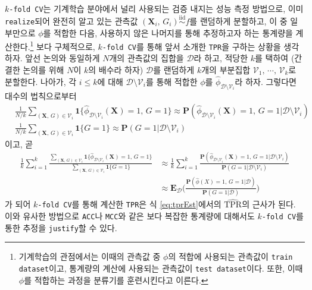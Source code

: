 \documentclass[10pt,onecolumn,twoside,a4size]{gsag3jnl}
\newcommand{\iid}{\stackrel{\mathrm{iid}}{\sim}}
\begin{document}
\texttt{$k$-fold CV}는 기계학습 분야에서 널리 사용되는 검증 내지는 성능 측정 방법으로, 이미 \texttt{realize}되어 완전히 알고 있는 관측값 $(\mathbf{X}_i,\,G_i)\iid f$를 랜덤하게 분할하고, 이 중 일부만으로 $\phi$를 적합한 다음, 사용하지 않은 나머지를 통해 추정하고자 하는 통계량을 계산한다.\footnote{기계학습의 관점에서는 이때의 관측값 중 $\phi$의 적합에 사용되는 관측값이 \texttt{train dataset}이고, 통계량의 계산에 사용되는 관측값이 \texttt{test dataset}이다. 또한, 이때 $\phi$를 적합하는 과정을 분류기를 훈련시킨다고 이른다.} 보다 구체적으로, \texttt{$k$-fold CV}를 통해 앞서 소개한 \texttt{TPR}을 구하는 상황을 생각하자. 앞선 논의와 동일하게 $N$개의 관측값의 집합을 $\mathcal{D}$라 하고, 적당한 $k$를 택하여 (간결한 논의를 위해 $N$이 $k$의 배수라 하자) $\mathcal{D}$를 랜덤하게 $k$개의 부분집합 $\mathcal{V}_1,\,\cdots,\,\mathcal{V}_k$로 분할한다. 나아가, 각 $i\leq k$에 대해 $\mathcal{D}\setminus\mathcal{V}_i$를 통해 적합한 $\phi$를 $\widehat{\phi}_{\mathcal{D}\setminus\mathcal{V}_i}$라 하자. 그렇다면 대수의 법칙으로부터
\begin{align}
  &\frac{1}{N/k}\sum_{(\mathbf{X},\,G)\in\mathcal{V}_i}\mathbf{1}\{\widehat{\phi}_{\mathcal{D}\setminus\mathcal{V}_i}(\mathbf{X})=1,\,G=1\}\approx\mathbf{P}(\widehat{\phi}_{\mathcal{D}\setminus\mathcal{V}_i}(\mathbf{X})=1,\,G=1\vert\mathcal{D}\setminus\mathcal{V}_i)\\
  &\frac{1}{N/k}\sum_{(\mathbf{X},\,G)\in\mathcal{V}_i}\mathbf{1}\{G=1\}\approx\mathbf{P}(G=1\vert\mathcal{D}\setminus\mathcal{V}_i)
\end{align}
이고, 곧
\begin{align}
  \frac{1}{k}\sum_{i=1}^k\frac{\sum_{(\mathbf{X},\,G)\in\mathcal{V}_i}\mathbf{1}\{\widehat{\phi}_{\mathcal{D}\setminus\mathcal{V}_i}(\mathbf{X})=1,\,G=1\}}{\sum_{(\mathbf{X},\,G)\in\mathcal{V}_i}\mathbf{1}\{G=1\}}&\approx\frac{1}{k}\sum_{i=1}^k\frac{\mathbf{P}(\widehat{\phi}_{\mathcal{D}\setminus\mathcal{V}_i}(\mathbf{X})=1,\,G=1\vert\mathcal{D}\setminus\mathcal{V}_i)}{\mathbf{P}(G=1\vert\mathcal{D}\setminus\mathcal{V}_i)}\\
  &\approx\mathbf{E}_\mathcal{D}\bigg(\frac{\mathbf{P}(\widehat{\phi}(X)=1,\,G=1\vert\mathcal{D})}{\mathbf{P}(G=1\vert\mathcal{D})}\bigg)\nonumber
\end{align}
가 되어 \texttt{$k$-fold CV}를 통해 계산한 \texttt{TPR}은 식 \ref{eq:tprEst}에서의 $\widehat{\mathrm{TPR}}$의 근사가 된다. 이와 유사한 방법으로 \texttt{ACC}나 \texttt{MCC}와 같은 보다 복잡한 통계량에 대해서도 \texttt{$k$-fold CV}를 통한 추정을 \texttt{justify}할 수 있다.
\end{document}

